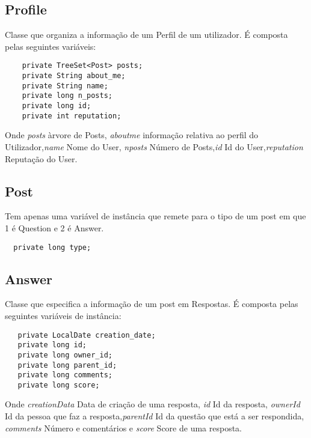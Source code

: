 \documentclass[letterpaper, 10 pt, conference]{IEEEtran}  %
\begin{document}
 \subsection{Profile}
 Classe que organiza a informação de um Perfil de um utilizador.
 \newline
 É composta pelas seguintes variáveis:

 \begin{lstlisting}
    private TreeSet<Post> posts;
    private String about_me;
    private String name;
    private long n_posts;
    private long id;
    private int reputation;
 \end{lstlisting}

 Onde \textit{posts} àrvore de Posts, \textit{aboutme} informação relativa ao perfil do Utilizador,\textit{name} Nome do User, \textit{nposts} Número de Posts,\textit{id} Id do User,\textit{reputation} Reputação do User.

 \subsection{Post}
 Tem apenas uma variável de instância que remete para o tipo de um post em que 1 é Question e 2 é Answer.

 \begin{lstlisting}
  private long type;
 \end{lstlisting}

 \newline

  \subsection{Answer}

  Classe que especifica a informação de um post em Respostas.
  \newline
  É composta pelas seguintes variáveis de instância:

 \begin{lstlisting}
   private LocalDate creation_date;
   private long id;
   private long owner_id;
   private long parent_id;
   private long comments;
   private long score;
 \end{lstlisting}

 Onde \textit{creationData} Data de criação de uma resposta, \textit{id} Id da resposta, \textit{ownerId} Id da pessoa que faz a resposta,\textit{parentId} Id da questão que está a ser respondida, \textit{comments} Número e comentários e \textit{score} Score de uma resposta.
\end{document}
